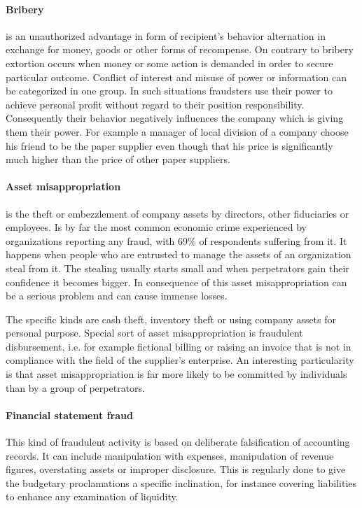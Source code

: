 \paragraph{Bribery} is an unauthorized advantage in form of recipient's behavior alternation in exchange for money, goods or other forms of recompense. On contrary to bribery extortion occurs when money or some action is demanded in order to secure particular outcome. Conflict of interest and misuse of power or information can be categorized in one group. In such situations fraudsters use their power to achieve personal profit without regard to their position responsibility. Consequently their behavior negatively influences the company which is giving them their power. For example a manager of local division of a company choose his friend to be the paper supplier even though that his price is significantly much higher than the price of other paper suppliers.


\paragraph {Asset misappropriation}
is the theft or embezzlement of company assets by directors, other fiduciaries or employees. Is by far the most common economic crime experienced by organizations reporting any fraud, with 69\% of respondents suffering from it.  It happens when people who are entrusted to manage the assets of an organization steal from it. The stealing usually starts small and when perpetrators gain their confidence it becomes bigger. In consequence of this asset misappropriation can be a serious problem and can cause immense losses. 

The specific kinds are cash theft, inventory theft or using company assets for personal purpose. Special sort of asset misappropriation is fraudulent disbursement, i.e. for example fictional billing or raising an invoice that is not in compliance with the field of the supplier's enterprise. An interesting particularity is that asset misappropriation is far more likely to be committed by individuals than by a group of perpetrators.


\paragraph {Financial statement fraud}
This kind of fraudulent activity is based on deliberate falsification of accounting records. It can include manipulation with expenses, manipulation of revenue figures, overstating assets or improper disclosure. This is regularly done to give the budgetary proclamations a specific inclination, for instance covering liabilities to enhance any examination of liquidity.

